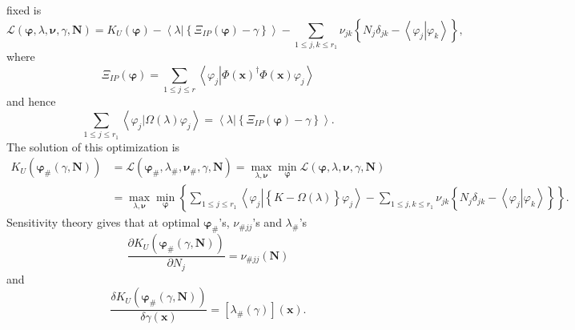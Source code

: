 \documentclass[aps,preprint]{revtex4}%
\begin{document}
fixed is%
\[
\mathcal{L}\left(  \mathbf{\varphi},\lambda,\mathbf{\nu},\gamma,\mathbf{N}%
\right)  =K_{U}\left(  \mathbf{\varphi}\right)  -\left\langle \left.
\lambda\right\vert \left\{  \Xi_{IP}\left(  \mathbf{\varphi}\right)
-\gamma\right\}  \right\rangle -\sum_{1\leq j,k\leq r_{1}}\nu_{jk}\left\{
N_{j}\delta_{jk}-\left\langle \left.  \varphi_{j}\right\vert \varphi
_{k}\right\rangle \right\}  ,
\]
where
\begin{equation}
\Xi_{IP}\left(  \mathbf{\varphi}\right)  =\sum_{1\leq j\leq r}\left\langle
\varphi_{j}\left\vert \Phi\left(  \mathbf{x}\right)  ^{\dagger}\Phi\left(
\mathbf{x}\right)  \right.  \varphi_{j}\right\rangle
\end{equation}
and hence
\begin{equation}
\sum_{1\leq j\leq r_{1}}\left\langle \varphi_{j}\left\vert \Omega\left(
\lambda\right)  \right.  \varphi_{j}\right\rangle =\left\langle \left.
\lambda\right\vert \left\{  \Xi_{IP}\left(  \mathbf{\varphi}\right)
-\gamma\right\}  \right\rangle .
\end{equation}
The solution of this optimization is
\begin{align}
K_{U}\left(  \mathbf{\varphi}_{\#}\left(  \gamma,\mathbf{N}\right)  \right)
&  =\mathcal{L}\left(  \mathbf{\varphi}_{\#},\lambda_{\#},\mathbf{\nu}%
_{\#},\gamma,\mathbf{N}\right)  =\max_{\lambda,\mathbf{\nu}}\min
_{\mathbf{\varphi}}\mathcal{L}\left(  \mathbf{\varphi},\lambda,\mathbf{\nu
},\gamma,\mathbf{N}\right) \nonumber\\
&  =\max_{\lambda,\mathbf{\nu}}\min_{\mathbf{\varphi}}\left\{  \sum_{1\leq
j\leq r_{1}}\left\langle \varphi_{j}\left\vert \left\{  \overset{}%
{K-\Omega\left(  \lambda\right)  }\right\}  \varphi_{j}\right.  \right\rangle
-\sum_{1\leq j,k\leq r_{1}}\nu_{jk}\left\{  N_{j}\delta_{jk}-\left\langle
\left.  \varphi_{j}\right\vert \varphi_{k}\right\rangle \right\}  \right\}  .
\end{align}
Sensitivity theory gives that at optimal $\mathbf{\varphi}_{\#}$'s,
$\nu_{\#jj}$'s and $\lambda_{\#}$'s
\begin{equation}
\frac{\partial K_{U}\left(  \mathbf{\varphi}_{\#}\left(  \gamma,\mathbf{N}%
\right)  \right)  }{\partial N_{j}}=\nu_{\#jj}\left(  \mathbf{N}\right)
\end{equation}
and
\begin{equation}
\frac{\delta K_{U}\left(  \mathbf{\varphi}_{\#}\left(  \gamma,\mathbf{N}%
\right)  \right)  }{\delta\gamma\left(  \mathbf{x}\right)  }=\left[
\lambda_{\#}\left(  \gamma\right)  \right]  \left(  \mathbf{x}\right)  .
\end{equation}
\end{document}
